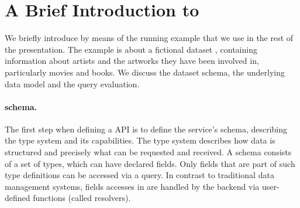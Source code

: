 \section{A Brief Introduction to \gql}\label{sec:bg}


We briefly introduce \gql by means of the running example that we use in
the rest of the presentation.  The example is about a fictional
dataset \goodbois, containing information about artists and the
artworks they have been involved in, particularly movies and books.
We discuss the dataset schema, the underlying data model and the query
evaluation. 




\paragraph{\gql schema.}
The first step when defining a \gql API is to define the service's schema, 
describing the type system and its capabilities.
The type system describes how data is structured and 
precisely what can be requested and received. 
A schema consists of a set of types, which can have declared fields. Only fields that are part of such type definitions can be accessed via a \gql query. In contrast to traditional data management systems, fields accesses in \gql are handled by the backend via user-defined functions (called resolvers).


